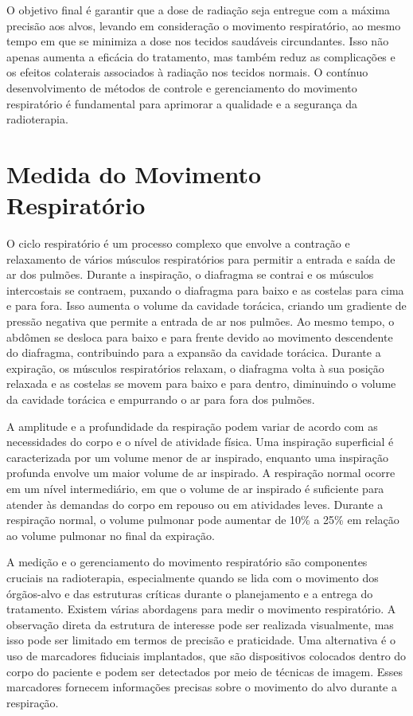 \documentclass[11pt,a4paper]{article}
\begin{document}
	O objetivo final é garantir que a dose de radiação seja entregue com a máxima precisão aos alvos, levando em consideração o movimento respiratório, ao mesmo tempo em que se minimiza a dose nos tecidos saudáveis circundantes. Isso não apenas aumenta a eficácia do tratamento, mas também reduz as complicações e os efeitos colaterais associados à radiação nos tecidos normais. O contínuo desenvolvimento de métodos de controle e gerenciamento do movimento respiratório é fundamental para aprimorar a qualidade e a segurança da radioterapia.

\section{Medida do Movimento Respiratório}

	O ciclo respiratório é um processo complexo que envolve a contração e relaxamento de vários músculos respiratórios para permitir a entrada e saída de ar dos pulmões. Durante a inspiração, o diafragma se contrai e os músculos intercostais se contraem, puxando o diafragma para baixo e as costelas para cima e para fora. Isso aumenta o volume da cavidade torácica, criando um gradiente de pressão negativa que permite a entrada de ar nos pulmões. Ao mesmo tempo, o abdômen se desloca para baixo e para frente devido ao movimento descendente do diafragma, contribuindo para a expansão da cavidade torácica. Durante a expiração, os músculos respiratórios relaxam, o diafragma volta à sua posição relaxada e as costelas se movem para baixo e para dentro, diminuindo o volume da cavidade torácica e empurrando o ar para fora dos pulmões.

	A amplitude e a profundidade da respiração podem variar de acordo com as necessidades do corpo e o nível de atividade física. Uma inspiração superficial é caracterizada por um volume menor de ar inspirado, enquanto uma inspiração profunda envolve um maior volume de ar inspirado. A respiração normal ocorre em um nível intermediário, em que o volume de ar inspirado é suficiente para atender às demandas do corpo em repouso ou em atividades leves. Durante a respiração normal, o volume pulmonar pode aumentar de 10\% a 25\% em relação ao volume pulmonar no final da expiração.

	A medição e o gerenciamento do movimento respiratório são componentes cruciais na radioterapia, especialmente quando se lida com o movimento dos órgãos-alvo e das estruturas críticas durante o planejamento e a entrega do tratamento. Existem várias abordagens para medir o movimento respiratório. A observação direta da estrutura de interesse pode ser realizada visualmente, mas isso pode ser limitado em termos de precisão e praticidade. Uma alternativa é o uso de marcadores fiduciais implantados, que são dispositivos colocados dentro do corpo do paciente e podem ser detectados por meio de técnicas de imagem. Esses marcadores fornecem informações precisas sobre o movimento do alvo durante a respiração.
\end{document}
